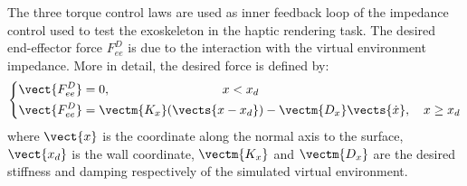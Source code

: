 The three torque control laws are used as inner feedback loop of the impedance control used to test the exoskeleton in the haptic rendering task. The desired end-effector force $F_{ee}^D$ is due to the interaction with the virtual environment impedance. More in detail, the desired force is defined by:
%
\begin{equation}
\label{eq:desiredVE}
\left \{
\begin{aligned}
& \vect{ F_{ee}^D} = 0, \ \ \ \quad \quad \quad \quad \quad \quad \quad \quad  x < x_d \\
& \vect{F_{ee}^D} = \vectm{K_x} (\vects{x - x_d}) - \vectm{D_x}\vects{\dot{x}}, \quad  x \geq x_d  \\
\end{aligned}
\right .
\end{equation}
%
%
%
where $\vect{x}$ is the coordinate along the normal axis to the surface, $\vect{x_d}$   is the wall coordinate, $\vectm{K_x}$ and $\vectm{D_x}$ are the desired stiffness and damping respectively of the simulated virtual environment.

